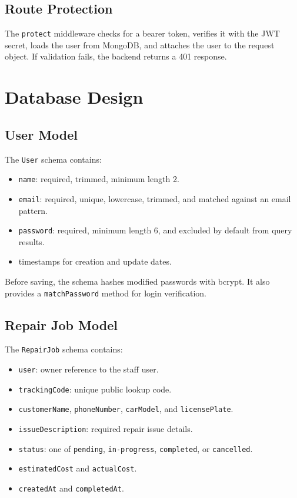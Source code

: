 \documentclass[12pt,a4paper]{report}
\begin{document}
\section{Route Protection}

The \texttt{protect} middleware checks for a bearer token, verifies it with the JWT secret, loads the user from MongoDB, and attaches the user to the request object. If validation fails, the backend returns a 401 response.

\chapter{Database Design}

\section{User Model}

The \texttt{User} schema contains:

\begin{itemize}
  \item \texttt{name}: required, trimmed, minimum length 2.
  \item \texttt{email}: required, unique, lowercase, trimmed, and matched against an email pattern.
  \item \texttt{password}: required, minimum length 6, and excluded by default from query results.
  \item timestamps for creation and update dates.
\end{itemize}

Before saving, the schema hashes modified passwords with bcrypt. It also provides a \texttt{matchPassword} method for login verification.

\section{Repair Job Model}

The \texttt{RepairJob} schema contains:

\begin{itemize}
  \item \texttt{user}: owner reference to the staff user.
  \item \texttt{trackingCode}: unique public lookup code.
  \item \texttt{customerName}, \texttt{phoneNumber}, \texttt{carModel}, and \texttt{licensePlate}.
  \item \texttt{issueDescription}: required repair issue details.
  \item \texttt{status}: one of \texttt{pending}, \texttt{in-progress}, \texttt{completed}, or \texttt{cancelled}.
  \item \texttt{estimatedCost} and \texttt{actualCost}.
  \item \texttt{createdAt} and \texttt{completedAt}.
\end{itemize}
\end{document}
